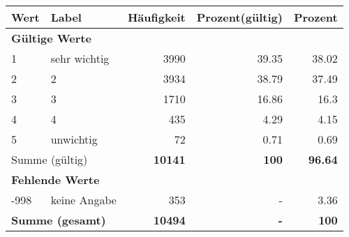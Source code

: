      \begin{longtable}{lXrrr}
     \toprule
     \textbf{Wert} & \textbf{Label} & \textbf{Häufigkeit} & \textbf{Prozent(gültig)} & \textbf{Prozent} \\
     \endhead
     \midrule
     \multicolumn{5}{l}{\textbf{Gültige Werte}}\\

     1 &
     \multicolumn{1}{X}{ sehr wichtig   } &


       \num{3990} &
       \num[round-mode=places,round-precision=2]{39,35} &
         \num[round-mode=places,round-precision=2]{38,02} \\

     2 &
     \multicolumn{1}{X}{ 2   } &


       \num{3934} &
       \num[round-mode=places,round-precision=2]{38,79} &
         \num[round-mode=places,round-precision=2]{37,49} \\

     3 &
     \multicolumn{1}{X}{ 3   } &


       \num{1710} &
       \num[round-mode=places,round-precision=2]{16,86} &
         \num[round-mode=places,round-precision=2]{16,3} \\

     4 &
     \multicolumn{1}{X}{ 4   } &


       \num{435} &
       \num[round-mode=places,round-precision=2]{4,29} &
         \num[round-mode=places,round-precision=2]{4,15} \\

     5 &
     \multicolumn{1}{X}{ unwichtig   } &


       \num{72} &
       \num[round-mode=places,round-precision=2]{0,71} &
         \num[round-mode=places,round-precision=2]{0,69} \\
     \midrule
     \multicolumn{2}{l}{Summe (gültig)} &
       \textbf{\num{10141}} &
     \textbf{100} &
       \textbf{\num[round-mode=places,round-precision=2]{96,64}} \\
     \multicolumn{5}{l}{\textbf{Fehlende Werte}}\\
       -998 &
       keine Angabe &
         \num{353} &
        - &
         \num[round-mode=places,round-precision=2]{3,36} \\
     \midrule
     \multicolumn{2}{l}{\textbf{Summe (gesamt)}} &
          \textbf{\num{10494}} &
        \textbf{-} &
        \textbf{100} \\
     \bottomrule
     \end{longtable}
     
